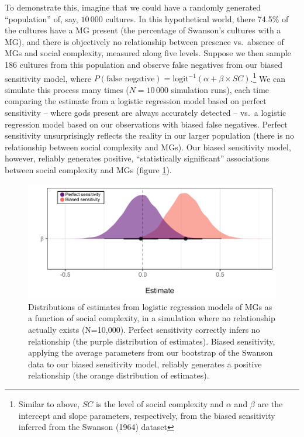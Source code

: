 \documentclass[
]{article}
\begin{document}
To demonstrate this, imagine that we could have a randomly generated ``population'' of, say, \(10\,000\) cultures. In this hypothetical world, there 74.5\% of the cultures have a MG present (the percentage of Swanson's cultures with a MG), and there is objectively no relationship between presence vs.~absence of MGs and social complexity, measured along five levels. Suppose we then sample 186 cultures from this population and observe false negatives from our biased sensitivity model, where \(P(\text{false negative}) = \text{logit}^{-1}(\alpha+\beta \times SC)\).\footnote{Similar to above, $SC$ is the level of social complexity and $\alpha$ and $\beta$ are the intercept and slope parameters, respectively, from the biased sensitivity inferred from the Swanson (1964) dataset} We can simulate this process many times (\(N=10\,000\) simulation runs), each time comparing the estimate from a logistic regression model based on perfect sensitivity -- where gods present are always accurately detected -- vs.~a logistic regression model based on our observations with biased false negatives. Perfect sensitivity unsurprisingly reflects the reality in our larger population (there is no relationship between social complexity and MGs). Our biased sensitivity model, however, reliably generates positive, ``statistically significant'' associations between social complexity and MGs (figure \ref{fig:biasedSimuation1}).

\begin{figure}
\centering
\includegraphics{mhg-writeup_files/figure-latex/biasedSimuation1-1.pdf}
\caption{\label{fig:biasedSimuation1}Distributions of estimates from logistic regression models of MGs as a function of social complexity, in a simulation where no relationship actually exists (N=10,000). Perfect sensitivity correctly infers no relationship (the purple distribution of estimates). Biased sensitivity, applying the average parameters from our bootstrap of the Swanson data to our biased sensitivity model, reliably generates a positive relationship (the orange distribution of estimates).}
\end{figure}
\end{document}
